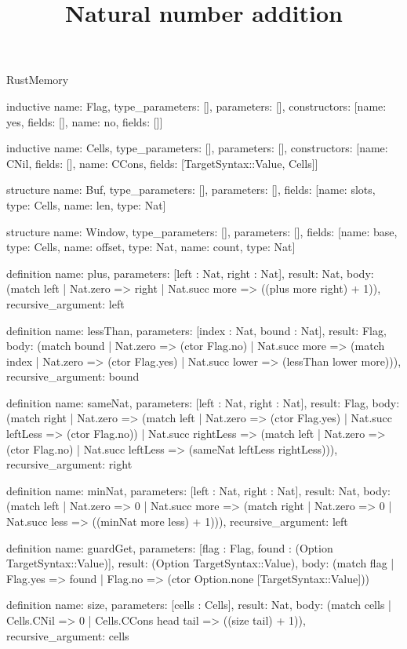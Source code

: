\begin{lexlean}{RustMemory}
\title{Natural number addition}
\begin{semanticmodule}
inductive{
  name: Flag,
  type_parameters: [],
  parameters: [],
  constructors: [{name: yes, fields: []}, {name: no, fields: []}]
}

inductive{
  name: Cells,
  type_parameters: [],
  parameters: [],
  constructors: [{name: CNil, fields: []}, {name: CCons, fields: [TargetSyntax::Value, Cells]}]
}

structure{
  name: Buf,
  type_parameters: [],
  parameters: [],
  fields: [{name: slots, type: Cells}, {name: len, type: Nat}]
}

structure{
  name: Window,
  type_parameters: [],
  parameters: [],
  fields: [{name: base, type: Cells}, {name: offset, type: Nat}, {name: count, type: Nat}]
}

definition{
  name: plus,
  parameters: [left : Nat, right : Nat],
  result: Nat,
  body: (match left | Nat.zero => right | Nat.succ more => ((plus more right) + 1)),
  recursive_argument: left
}

definition{
  name: lessThan,
  parameters: [index : Nat, bound : Nat],
  result: Flag,
  body: (match bound
    | Nat.zero => (ctor Flag.no)
    | Nat.succ more => (match index
      | Nat.zero => (ctor Flag.yes)
      | Nat.succ lower => (lessThan lower more))),
  recursive_argument: bound
}

definition{
  name: sameNat,
  parameters: [left : Nat, right : Nat],
  result: Flag,
  body: (match right
    | Nat.zero => (match left | Nat.zero => (ctor Flag.yes) | Nat.succ leftLess => (ctor Flag.no))
    | Nat.succ rightLess => (match left
      | Nat.zero => (ctor Flag.no)
      | Nat.succ leftLess => (sameNat leftLess rightLess))),
  recursive_argument: right
}

definition{
  name: minNat,
  parameters: [left : Nat, right : Nat],
  result: Nat,
  body: (match left
    | Nat.zero => 0
    | Nat.succ more => (match right | Nat.zero => 0 | Nat.succ less => ((minNat more less) + 1))),
  recursive_argument: left
}

definition{
  name: guardGet,
  parameters: [flag : Flag, found : (Option TargetSyntax::Value)],
  result: (Option TargetSyntax::Value),
  body: (match flag | Flag.yes => found | Flag.no => (ctor Option.none [TargetSyntax::Value]))
}

definition{
  name: size,
  parameters: [cells : Cells],
  result: Nat,
  body: (match cells | Cells.CNil => 0 | Cells.CCons head tail => ((size tail) + 1)),
  recursive_argument: cells
}


\end{semanticmodule}
\end{lexlean}
